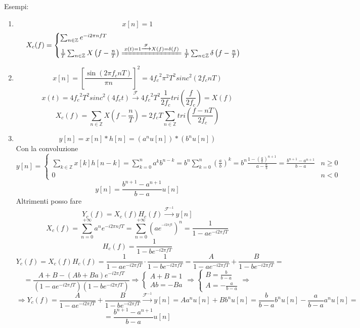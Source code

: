 \documentclass{article}
\newcommand{\trasformata}{\xrightarrow{\mathscr{F}}}
\newcommand{\antitrasformata}{\xrightarrow{\mathscr{F}^{-1}}}
\begin{document}
Esempi:\begin{enumerate}
    \item \[x[n]=1\]
        \[X_c(f)=\begin{cases}
            \sum_{n\in\mathbb{Z}}e^{-i2\pi nfT}\\
            \frac{1}{T}\sum_{n\in\mathbb{Z}}X\left(f-\frac{n}{T}\right)\xlongequal{x(t)=1\trasformata X(f)=\delta(f)}\frac{1}{T}\sum_{n\in\mathbb{Z}}\delta\left(f-\frac{n}{T}\right)
        \end{cases}\]
    \item \[x[n]={\left[\frac{\sin(2\pi f_c nT)}{\pi n}\right]}^2=4 {f_c}^2 \pi^2 T^2 {sinc}^2(2f_c nT)\]
        \[x(t)=4{f_c}^2 T^2{sinc}^2(4f_c t)\trasformata 4{f_c}^2 T^2\frac{1}{2f_c}tri\left(\frac{f}{2f_c}\right)=X(f)\]
        \[X_c(f)=\sum_{n\in\mathbb{Z}}X\left(f-\frac{n}{T}\right)=2f_c T\sum_{n\in\mathbb{Z}} tri\left(\frac{f-nT}{2f_c}\right)\]
    \item \[y[n]=x[n]*h[n]=(a^n u[n])*(b^n u[n])\]
        Con la convoluzione
        \[y[n]=\begin{cases}
            \sum_{k\in\mathbb{Z}}x[k]h[n-k]=\sum_{k=0}^{n}a^{k}b^{n-k}=b^n\sum_{k=0}^{n}{\left(\frac{a}{b}\right)}^k=b^n\frac{1-{\left(\frac{a}{b}\right)}^{n+1}}{a-\frac{a}{b}}=\frac{b^{n+1}-a^{n+1}}{b-a}&n\geq0\\
            0&n<0
        \end{cases}\]
        \[y[n]=\frac{b^{n+1}-a^{n+1}}{b-a}u[n]\]
        Altrimenti posso fare
        \[Y_c(f)=X_c(f)H_c(f)\antitrasformata y[n]\]
        \[X_c(f)=\sum_{n=0}^{+\infty}a^n e^{-i2\pi nfT}=\sum_{n=0}^{+\infty}{(ae^{^{-i2\pi ft}})}^n=\frac{1}{1-ae^{-i2\pi fT}}\]
        \[H_c(f)=\frac{1}{1-be^{-i2\pi fT}}\]
        \[Y_c(f)=X_c(f)H_c(f)=\frac{1}{1-ae^{-i2\pi fT}}\cdot\frac{1}{1-be^{-i2\pi fT}}=\frac{A}{1-ae^{-i2\pi fT}}+\frac{B}{1-be^{-i2\pi fT}}=\]
        \[=\frac{A+B-(Ab+Ba)e^{-i2\pi fT}}{(1-ae^{-i2\pi fT})(1-be^{-i2\pi fT})}\Rightarrow\begin{cases}
            A+B=1\\Ab=-Ba
        \end{cases}\Rightarrow\begin{cases}
            B=\frac{b}{b-a}\\A=-\frac{a}{b-a}
        \end{cases}\Rightarrow\]
        \[\Rightarrow Y_c(f)=\frac{A}{1-ae^{-i2\pi fT}}+\frac{B}{1-be^{-i2\pi fT}}\antitrasformata y[n]=A a^n u[n]+B b^n u[n]=\frac{b}{b-a}b^n u[n]-\frac{a}{b-a} a^n u[n]=\]
        \[=\frac{b^{n+1}-a^{n+1}}{b-a}u[n]\]

\end{enumerate}
\end{document}
